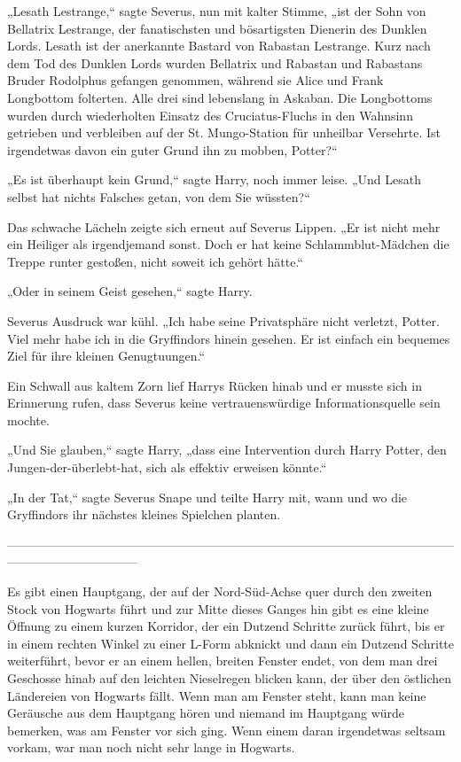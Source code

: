 {„Lesath Lestrange,“ sagte Severus, nun mit kalter Stimme, „ist der Sohn von Bellatrix Lestrange, der fanatischsten und bösartigsten Dienerin des Dunklen Lords. Lesath ist der anerkannte Bastard von Rabastan Lestrange. Kurz nach dem Tod des Dunklen Lords wurden Bellatrix und Rabastan und Rabastans Bruder Rodolphus gefangen genommen, während sie Alice und Frank Longbottom folterten. Alle drei sind lebenslang in Askaban. Die Longbottoms wurden durch wiederholten Einsatz des Cruciatus-Fluchs in den Wahnsinn getrieben und verbleiben auf der St. Mungo-Station für unheilbar Versehrte. Ist irgendetwas davon ein guter Grund ihn zu mobben, Potter?“

„Es ist überhaupt kein Grund,“ sagte Harry, noch immer leise. „Und Lesath selbst hat nichts Falsches getan, von dem Sie wüssten?“

Das schwache Lächeln zeigte sich erneut auf Severus Lippen. „Er ist nicht mehr ein Heiliger als irgendjemand sonst. Doch er hat keine Schlammblut-Mädchen die Treppe runter gestoßen, nicht soweit ich gehört hätte.“

„Oder in seinem Geist gesehen,“ sagte Harry.

Severus Ausdruck war kühl. „Ich habe seine Privatsphäre nicht verletzt, Potter. Viel mehr habe ich in die Gryffindors hinein gesehen. Er ist einfach ein bequemes Ziel für ihre kleinen Genugtuungen.“

Ein Schwall aus kaltem Zorn lief Harrys Rücken hinab und er musste sich in Erinnerung rufen, dass Severus keine vertrauenswürdige Informationsquelle sein mochte.

„Und Sie glauben,“ sagte Harry, „dass eine Intervention durch Harry Potter, den Jungen-der-überlebt-hat, sich als effektiv erweisen könnte.“

„In der Tat,“ sagte Severus Snape und teilte Harry mit, wann und wo die Gryffindors ihr nächstes kleines Spielchen planten.

--------------------------------------------------------------------------------------------------------------------------------------------

Es gibt einen Hauptgang, der auf der Nord-Süd-Achse quer durch den zweiten Stock von Hogwarts führt und zur Mitte dieses Ganges hin gibt es eine kleine Öffnung zu einem kurzen Korridor, der ein Dutzend Schritte zurück führt, bis er in einem rechten Winkel zu einer L-Form abknickt und dann ein Dutzend Schritte weiterführt, bevor er an einem hellen, breiten Fenster endet, von dem man drei Geschosse hinab auf den leichten Nieselregen blicken kann, der über den östlichen Ländereien von Hogwarts fällt. Wenn man am Fenster steht, kann man keine Geräusche aus dem Hauptgang hören und niemand im Hauptgang würde bemerken, was am Fenster vor sich ging. Wenn einem daran irgendetwas seltsam vorkam, war man noch nicht sehr lange in Hogwarts.

}

